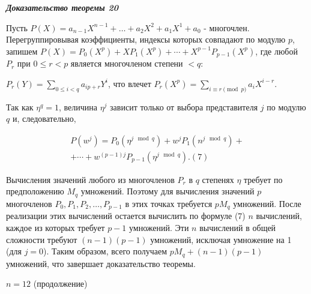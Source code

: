 \documentclass{mai_book}
\begin{document}
	\medskip
	
	\noindent\textit{\bf Доказательство теоремы 20}
	
	\smallskip
	
	Пусть $P(X) = a_{n-1}X^{n-1}+\ldots+a_2X^2+a_1X^1+a_0$ - многочлен. Перегруппировывая коэффициенты, индексы которых совпадают по модулю $p$, запишем $P(X)=P_0(X^p)+XP_1(X^p)+\cdots+X^{p-1}P_{p-1}(X^p)$, где любой $P_r$ при $0 \leq r < p$ является многочленом степени $< q$:
	\begin{center}
		$P_r(Y)=\sum_{0 \leq i < q}a_{ip+r}Y^i$, что влечет $P_r(X^p)=\sum_{i \equiv r \pmod p}a_iX^{i-r}$.
	\end{center}
	Так как $\eta^q = 1$, величина $\eta^j$ зависит только от выбора представителя $j$ по модулю $q$ и, следовательно,
	
	\begin{multline*}
	P(w^j)=P_0(\eta^{j \mod q}) + w^jP_1(n^{j \mod q}) + \\
	+ \cdots + w^{(p-1)j}P_{p-1}(\eta^{j \mod q}).  (7)
	\end{multline*}
	
	\noindent Вычисления значений любого из многочленов $P_r$ в $q$ степенях $\eta$ требует по предположению $M_q$ умножений. Поэтому для вычисления значений $p$ многочленов $P_0,P_1,P_2,\dots,P_{p-1}$ в этих точках требуется $pM_q$ умножений. После реализации этих вычислений остается вычислить по формуле (7) $n$ вычислений, каждое из которых требует $p-1$ умножений. Эти $n$ вычислений в общей сложности требуют $(n-1)(p-1)$ умножений, исключая умножение на 1 (для $j=0$). Таким образом, всего получаем $pM_q+(n-1)(p-1)$ умножений, что завершает доказательство теоремы.
	
	\smallskip
	
	 $n = 12$ (продолжение)
	
	\smallskip
	
\end{document}
